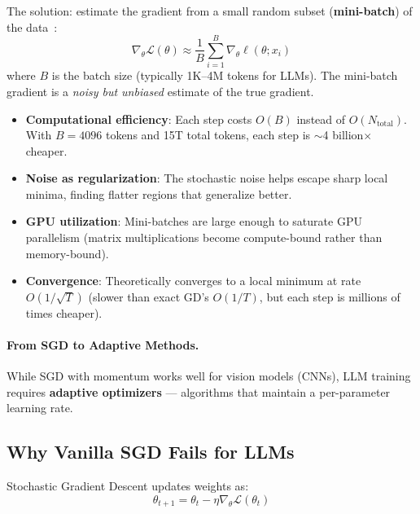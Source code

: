The solution: estimate the gradient from a small random subset (\textbf{mini-batch}) of the data~\cite{robbins1951stochastic}: 
\[
\nabla_\theta \mathcal{L}(\theta) \approx \frac{1}{B}\sum_{i=1}^{B} \nabla_\theta \ell(\theta; x_i)
\]
 where $B$ is the batch size (typically 1K--4M tokens for LLMs). The mini-batch gradient is a \emph{noisy but unbiased} estimate of the true gradient.

\begin{keybox}
\begin{itemize}
  \item \textbf{Computational efficiency}: Each step costs $O(B)$ instead of $O(N_{\text{total}})$. With $B = 4096$ tokens and 15T total tokens, each step is $\sim$4 billion$\times$ cheaper.
  \item \textbf{Noise as regularization}: The stochastic noise helps escape sharp local minima, finding flatter regions that generalize better.
  \item \textbf{GPU utilization}: Mini-batches are large enough to saturate GPU parallelism (matrix multiplications become compute-bound rather than memory-bound).
  \item \textbf{Convergence}: Theoretically converges to a local minimum at rate $O(1/\sqrt{T})$ (slower than exact GD’s $O(1/T)$, but each step is millions of times cheaper).
\end{itemize}
\end{keybox}

\paragraph{From SGD to Adaptive Methods.}
\label{from-sgd-to-adaptive-methods.}

While SGD with momentum works well for vision models (CNNs), LLM training requires \textbf{adaptive optimizers} --- algorithms that maintain a per-parameter learning rate.

\subsection{Why Vanilla SGD Fails for LLMs}
\label{why-vanilla-sgd-fails-for-llms}

Stochastic Gradient Descent updates weights as: 
\[
\theta_{t+1} = \theta_t - \eta \nabla_\theta \mathcal{L}(\theta_t)
\]

